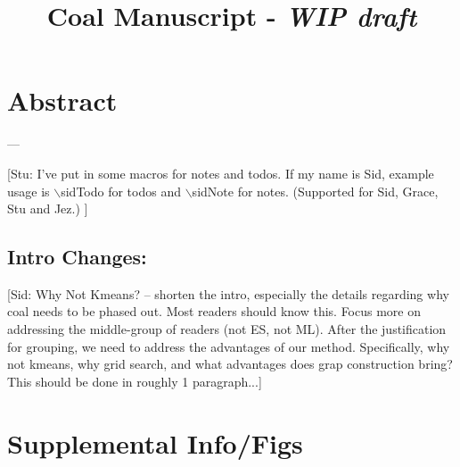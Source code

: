 \documentclass{article}
\title{Coal Manuscript - \textit{WIP draft}}
\author{}
\date{}
\newcommand{\sidTodo}[1]{{\color{red}[Sid: {#1}]}}
\newcommand{\stuTodo}[1]{{\color{magenta}[Stu: {#1}]}}
\begin{document}
\maketitle



% 
% 
\section*{Abstract}
---


\stuTodo{I've put in some macros for notes and todos. If my name is Sid, example usage is $\backslash$sidTodo for todos and $\backslash$sidNote for notes. (Supported for Sid, Grace, Stu and Jez.) }


\subsection*{Intro Changes:}
\sidTodo{Why Not Kmeans? -- shorten the intro, especially the details regarding why coal needs to be phased out. Most readers should know this. Focus more on addressing the middle-group of readers (not ES, not ML). 
After the justification for grouping, we need to address the advantages of our method. Specifically, why not kmeans, why grid search, and what advantages does grap construction bring? This should be done in roughly 1 paragraph...}












\section{Supplemental Info/Figs}






\end{document}
